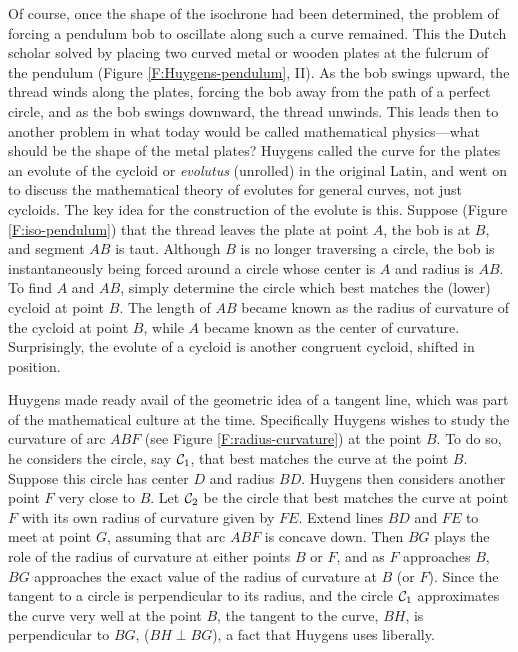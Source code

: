 \documentclass[12pt]{article}
\theoremstyle{definition}
\begin{document}
Of course, once the shape of the isochrone had been determined, the
problem of forcing a pendulum bob to oscillate along such a curve
remained.  This the Dutch scholar solved by placing two curved metal or
wooden plates
at the fulcrum of the pendulum (Figure \ref{F:Huygens-pendulum}, II).  As the
bob swings upward, the thread winds along the plates, forcing the bob
away from the path of a perfect circle, and as the bob swings
downward, the thread unwinds.  This leads then to another problem in
what today would be called mathematical physics---what should be the
shape of the metal plates?  Huygens called the curve for the plates an
evolute of the cycloid or {\em evolutus} (unrolled) in the original
Latin, and went on to discuss the mathematical theory of evolutes for
general curves, not just cycloids.  The key idea for the construction
of the evolute is this.  Suppose (Figure \ref{F:iso-pendulum}) 
that the thread leaves the plate at
point $A$, the bob is at $B$, and segment $AB$ is taut.  Although $B$
is no longer traversing a circle, the bob is instantaneously being
forced around a circle whose center is $A$ and radius is $AB$.  
To find $A$ and $AB$, simply determine the circle which
best matches the (lower) cycloid at point $B$.  The length of $AB$ became
known as the radius of curvature of the cycloid at point $B$, while $A$
became known as the center of curvature.  Surprisingly, the evolute of a
cycloid is another congruent cycloid, shifted in position.  

Huygens made ready avail of the
geometric idea of a tangent line, which was part of the mathematical
culture at the time.  Specifically Huygens wishes to study the
curvature of arc $ABF$ (see Figure \ref{F:radius-curvature}) at the point $B$.
To do so, he considers the circle, say ${\cal{C}}_1$, that best matches
the curve at the point $B$.  Suppose this circle has center $D$ and
radius $BD$.  Huygens then considers another point $F$ very close to
$B$.  Let ${\cal{C}}_2$ be the circle that best matches the curve
at point $F$ with its own radius of curvature given by $FE$.  Extend lines $BD$
and $FE$ to meet at point $G$, assuming that arc $ABF$ is concave
down.  Then $BG$ plays the role of the radius
of curvature at either points $B$ or $F$, and as $F$ approaches $B$,
$BG$ approaches the exact value of the radius of curvature at $B$ (or $F$).
Since the tangent to a circle is perpendicular to its
radius, and the circle ${\cal{C}}_1$ approximates the curve very well at
the point $B$, the tangent to the curve, $BH$, is perpendicular to
$BG$, ($BH \perp BG$), a fact that Huygens uses liberally.
\end{document}
